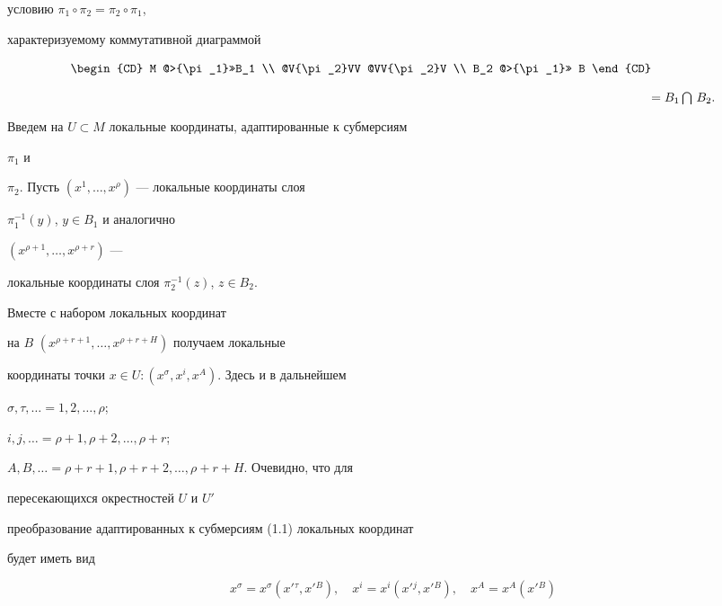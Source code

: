 условию $\pi_1\circ\pi_2=\pi_2\circ\pi_1$,


характеризуемому коммутативной диаграммой


\begin{equation}


\begin{CD}


M @>{\pi_1}>>B_1 \\


@V{\pi_2}VV @VV{\pi_2}V \\


B_2 @>{\pi_1}>> B


\end{CD}


\raisebox{-8.23mm}{$=B_1\bigcap\,B_2.$}


\end{equation}


Введем на $U\subset M$ локальные координаты, адаптированные к субмерсиям


$\pi_1$ и


$\pi_2$. Пусть $(x^1,\dotsc,x^\rho)$ --- локальные координаты слоя


$\pi^{-1}_1(y)$, $y\in B_1$ и аналогично


$(x^{\rho+1},\dotsc,x^{\rho+r})$ ---


локальные координаты слоя $\pi^{-1}_2(z)$, $z\in B_2$.


Вместе с набором локальных координат


на $B$ $(x^{\rho+r+1},\dotsc,x^{\rho+r+H})$ получаем локальные


координаты точки $x\in U:(x^\sigma,x^i,x^A)$. Здесь и в дальнейшем


$\sigma,\tau,\dotsc=1,2,\dotsc,\rho$;


$i,j,\dotsc=\rho+1,\rho+2,\dotsc,\rho+r$;


$A,B,\dotsc=\rho+r+1,\rho+r+2,\dotsc,\rho+r+H$. Очевидно, что для


пересекающихся окрестностей $U$ и $U'$


преобразование адаптированных к субмерсиям (1.1) локальных координат


будет иметь вид


\begin{equation}


x^\sigma=x^\sigma(x'{}^\tau,x'{}^B),\quad


x^i=x^i(x'{}^j,x'{}^B),\quad


x^A=x^A(x'{}^B)


\end{equation}


